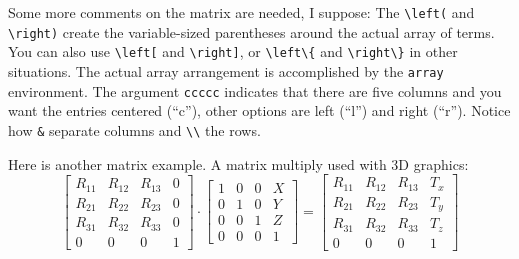 Some more comments on the matrix are needed, I suppose:
The \verb+\left(+ and \verb+\right)+ create the variable-sized parentheses
around the actual array of terms. You can also use \verb+\left[+ and
\verb+\right]+, or \verb+\left\{+ and \verb+\right\}+ in other situations.
The actual array arrangement is accomplished by the \verb+array+ environment.
The argument \verb+ccccc+ indicates that there are five columns
and you want the entries centered (``c''), other options are left (``l'')
and right (``r''). Notice how \verb+&+ separate columns and \verb+\\+
the rows.

Here is another matrix example.
A matrix multiply used with 3D graphics:
\begin{displaymath}
  \left[ \begin{array}{cccc}
        R_{11} & R_{12} & R_{13} & 0 \\
        R_{21} & R_{22} & R_{23} & 0 \\
        R_{31} & R_{32} & R_{33} & 0 \\
        0      & 0      & 0       & 1
    \end{array} \right]
  \cdot
  \left[ \begin{array}{cccc}
      1 & 0 & 0 & X \\
      0 & 1 & 0 & Y \\
      0 & 0 & 1 & Z \\
      0 & 0 & 0 & 1
  \end{array} \right] 
=  \left[ \begin{array}{cccc}
        R_{11} & R_{12} & R_{13} & T_x \\
        R_{21} & R_{22} & R_{23} & T_y \\
        R_{31} & R_{32} & R_{33} & T_z \\
        0      & 0      & 0       & 1
  \end{array} \right] 
\end{displaymath}


